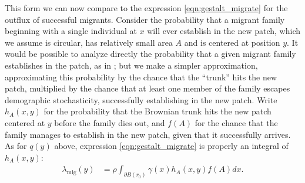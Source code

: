 \documentclass{article}
\newcommand{\E}{\mathbb{E}}
\newcommand{\migrate}{\lambda_\text{mig}}
\begin{document}
This form we can now compare to 
the expression \eqref{eqn:gestalt_migrate} for the outflux of successful migrants.
Consider the probability that a migrant family beginning with a single individual at $x$ will ever establish in the new patch,
which we assume is circular, has relatively small area $A$ and is centered at position $y$.
It would be possible to analyze directly the probability that a given migrant family establishes in the patch,
as in \citet{barton1987establishment};
but we make a simpler approximation, approximating this probability by the chance that the ``trunk'' hits the new patch,
multiplied by the chance that at least one member of the family escapes demographic stochasticity,
successfully establishing in the new patch.
Write $h_A(x,y)$ for the probability that the Brownian trunk
hits the new patch centered at $y$ before the family dies out,
and $f(A)$ for the chance that the family manages to establish in the new patch,
given that it successfully arrives.
As for $q(y)$ above, expression \eqref{eqn:gestalt_migrate} is properly an integral of $h_A(x,y)$:
\begin{align}\label{eqn:migrate_integral}
  \migrate(y) &= \rho \int_{\partial B(r_0)} \gamma(x) h_A(x,y) f(A) dx .
\end{align}
\end{document}
